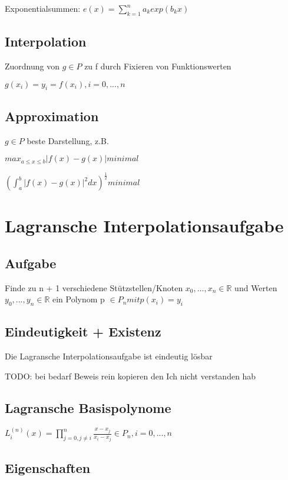 \documentclass[12pt,a4paper]{article} %
\begin{document}
	Exponentialsummen: $e(x) = \sum_{k = 1}^{n}a_kexp(b_kx)$
	
	\subsection{Interpolation}
	
	Zuordnung von $g \in P$ zu f durch Fixieren von Funktionswerten
	
	$g(x_i) = y_i = f(x_i), i = 0, ..., n$
	
	\subsection{Approximation}
	
	$g \in P$ beste Darstellung, z.B. 
	
	$max_{a \le x \le b}|f(x) - g(x)| minimal$
	
	$(\int_{a}^{b}|f(x) - g(x)|^2dx)^{\frac{1}{2}} minimal$
	
	\newpage
	
	\section{Lagransche Interpolationsaufgabe}
	
	\subsection{Aufgabe}
	
	Finde zu n + 1 verschiedene Stützstellen/Knoten $x_0, ..., x_n \in \mathbb{R}$ und Werten $y_0, ..., y_n \in \mathbb{R}$ ein Polynom p $\in P_n mit p(x_i) = y_i$
	
	\subsection{Eindeutigkeit + Existenz}
	
	Die Lagransche Interpolationsaufgabe ist eindeutig lösbar
	
	TODO: bei bedarf Beweis rein kopieren den Ich nicht verstanden hab
	
	\subsection{Lagransche Basispolynome}
	
	$L_i^{(n)}(x) = \prod_{j = 0, j \ne i}^{n} \frac{x - x_j}{x_i - x_j} \in P_n, i = 0, ..., n$
	
	\subsection{Eigenschaften}
	
\end{document}
